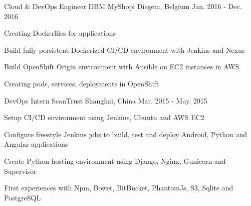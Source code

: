 \begin{cventries}
  \cventry
    {Cloud \& DevOps Engineer} %
    {DBM MyShopi} %
    {Diegem, Belgium} %
    {Jan. 2016 - Dec. 2016} %
    {
      \begin{cvitems} %
        \item {Creating Dockerfiles for applications}
        \item {Build fully persistent Dockerized CI/CD environment with Jenkins and Nexus}
        \item {Build OpenShift Origin environment with Ansible on EC2 instances in AWS}
        \item {Creating pods, services, deployments in OpenShift}
      \end{cvitems}
    }

  \cventry
    {DevOps Intern} %
    {ScanTrust} %
    {Shanghai, China} %
    {Mar. 2015 - May. 2015} %
    {
      \begin{cvitems} %
        \item {Setup CI/CD environment using Jenkins, Ubuntu and AWS EC2}
        \item {Configure freestyle Jenkins jobs to build, test and deploy Android, Python and Angular applications}
        \item {Create Python hosting environment using Django, Nginx, Gunicorn and Supervisor}        
        \item {First experiences with Npm, Bower, BitBucket, PhantomJs, S3, Sqlite and PostgreSQL}
      \end{cvitems}
    }

\end{cventries}